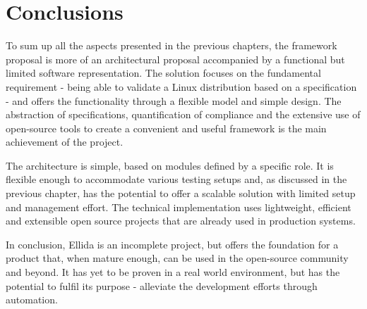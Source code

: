 \chapter{Conclusions}

To sum up all the aspects presented in the previous chapters, the framework proposal is more of an architectural proposal accompanied by a functional but limited software representation. The solution focuses on the fundamental requirement - being able to validate a Linux distribution based on a specification - and offers the functionality through a flexible model and simple design. The abstraction of specifications, quantification of compliance and the extensive use of open-source tools to create a convenient and useful framework is the main achievement of the project.

The architecture is simple, based on modules defined by a specific role. It is flexible enough to accommodate various testing setups and, as discussed in the previous chapter, has the potential to offer a scalable solution with limited setup and management effort. The technical implementation uses lightweight, efficient and extensible open source projects that are already used in production systems.

In conclusion, Ellida is an incomplete project, but offers the foundation for a product that, when mature enough, can be used in the open-source community and beyond. It has yet to be proven in a real world environment, but has the potential to fulfil its purpose - alleviate the development efforts through automation. 
